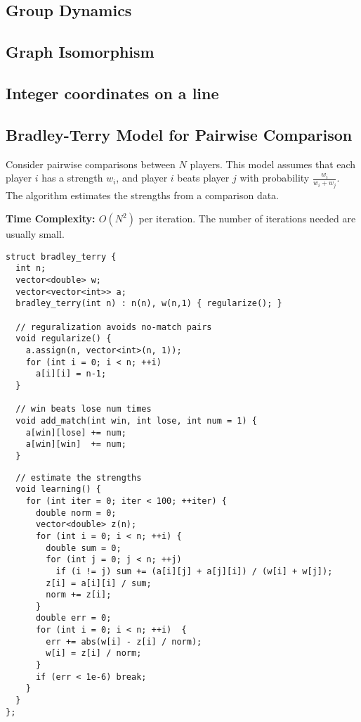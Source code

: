 \subsection{Group Dynamics}
\subsection{Graph Isomorphism}
\subsection{Integer coordinates on a line}
\subsection{Bradley-Terry Model for Pairwise Comparison}

Consider pairwise comparisons between $N$ players.
This model assumes that each player $i$ has a strength $w_i$,
and player $i$ beats player $j$ with probability $\frac{w_i}{w_i + w_j}$.
The algorithm estimates the strengths from a comparison data.

\textbf{Time Complexity: $O(N^2)$} per iteration. The number of iterations needed are usually small.

\begin{center}
\begin{minipage}[t]{0.45\linewidth}
\begin{lstlisting}
struct bradley_terry {
  int n;
  vector<double> w;
  vector<vector<int>> a;
  bradley_terry(int n) : n(n), w(n,1) { regularize(); }

  // reguralization avoids no-match pairs
  void regularize() {
    a.assign(n, vector<int>(n, 1));
    for (int i = 0; i < n; ++i)
      a[i][i] = n-1;
  }

  // win beats lose num times
  void add_match(int win, int lose, int num = 1) {
    a[win][lose] += num;
    a[win][win]  += num;
  }
\end{lstlisting}
\end{minipage}
\qquad
\begin{minipage}[t]{0.5\linewidth}
\begin{lstlisting}
  // estimate the strengths
  void learning() {
    for (int iter = 0; iter < 100; ++iter) {
      double norm = 0;
      vector<double> z(n);
      for (int i = 0; i < n; ++i) {
        double sum = 0;
        for (int j = 0; j < n; ++j) 
          if (i != j) sum += (a[i][j] + a[j][i]) / (w[i] + w[j]);
        z[i] = a[i][i] / sum;
        norm += z[i];
      }
      double err = 0;
      for (int i = 0; i < n; ++i)  {
        err += abs(w[i] - z[i] / norm);
        w[i] = z[i] / norm;
      }
      if (err < 1e-6) break;
    }
  }
};
\end{lstlisting}
\end{minipage}
\end{center}